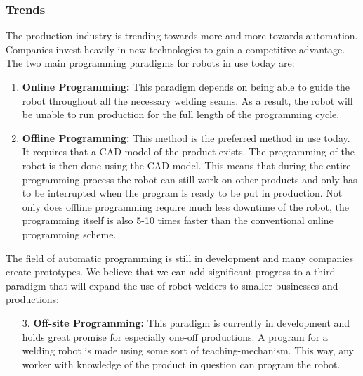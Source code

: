 \subsubsection{Trends}
\label{sec:trends}
The production industry is trending towards more and more towards automation.
Companies invest heavily in new technologies to gain a competitive advantage. 
The two main programming paradigms for robots in use today are:
\begin{enumerate}
\item \textbf{Online Programming:} This paradigm depends on being able to guide the robot throughout all the necessary welding seams. As a result, the robot will be unable to run production for the full length of the programming cycle.
\item \textbf{Offline Programming:} This method is the preferred method in use today. It requires that a CAD model of the product exists. 
The programming of the robot is then done using the CAD model. 
This means that during the entire programming process the robot can still work on other products and only has to be interrupted when the program is ready to be put in production. 
Not only does offline programming require much less downtime of the robot, the programming itself is also 5-10 times faster than the conventional online programming scheme.	
\end{enumerate}
The field of automatic programming is still in development and many companies create prototypes. We believe that we can add significant progress to a third paradigm that will expand the use of robot welders to smaller businesses and productions:
\begin{enumerate}
	\item[3.]{\textbf{Off-site Programming:}} This paradigm is currently in development and holds great promise for especially one-off productions. A program for a welding robot is made using some sort of teaching-mechanism. 
	This way, any worker with knowledge of the product in question can program the robot.
\end{enumerate}
